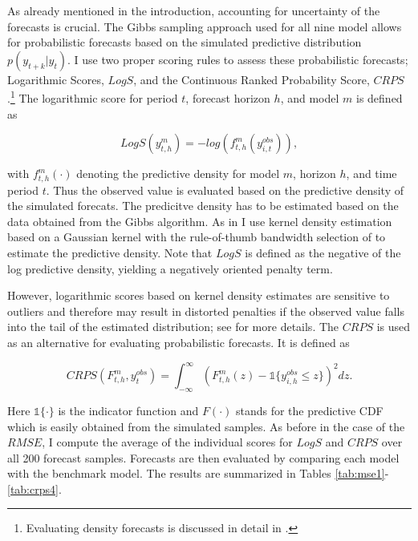 \documentclass[12pt,letterpaper,fleqn]{article}           %
\begin{document}
As already mentioned in the introduction, accounting for uncertainty of the forecasts is crucial. The Gibbs sampling approach used for all nine model allows for probabilistic forecasts based on the simulated predictive distribution $p(y_{t+k}|y_t)$. I use two proper scoring rules to assess these probabilistic forecasts; Logarithmic Scores, $LogS$, and the Continuous Ranked Probability Score, $CRPS$.\footnote{Evaluating density forecasts is discussed in detail in \textcite{gneiting07}.}  The logarithmic score for period $t$, forecast horizon $h$, and model $m$ is defined as   

\begin{equation}
LogS(y^m_{t,h}) = -log(f^m_{t,h}(y_{i,t}^{obs})),
\label{eq:log_score}
\end{equation}

with $f^m_{t,h}(\cdot)$ denoting the predictive density for model $m$, horizon $h$, and time period $t$. Thus the observed value is evaluated based on the predictive density of the simulated forecats. The predicitve density has to be estimated based on the data obtained from the Gibbs algorithm. As in \textcite{krueger19} I use kernel density estimation based on a Gaussian kernel with the rule-of-thumb bandwidth selection of \textcite{silverman86} to estimate the predictive density. Note that $LogS$ is defined as the negative of the log predictive density, yielding a negatively oriented penalty term.

However, logarithmic scores based on kernel density estimates are sensitive to outliers and therefore may result in distorted penalties if the observed value falls into the tail of the estimated distribution; see \textcite{krueger19} for more details. The $CRPS$ is used as an alternative for evaluating probabilistic forecasts. It is defined as

\begin{equation}
CRPS(F^m_{t,h}, y_{t}^{obs}) = \int_{- \infty}^\infty \left(F^m_{t,h}(z) - \mathds{1}\{y_{i,h}^{obs} \leq z\} \right)^2 dz.
\label{eq:crps}
\end{equation}

Here $\mathds{1}\{\cdot\}$ is the indicator function and $F(\cdot)$ stands for the predictive CDF which is easily obtained from the simulated samples. As before in the case of the $RMSE$, I compute the average of the individual scores for $LogS$ and $CRPS$ over all 200 forecast samples. Forecasts are then evaluated by comparing each model with the benchmark model. The results are summarized in Tables \ref{tab:mse1}-\ref{tab:crps4}.%
\end{document}
